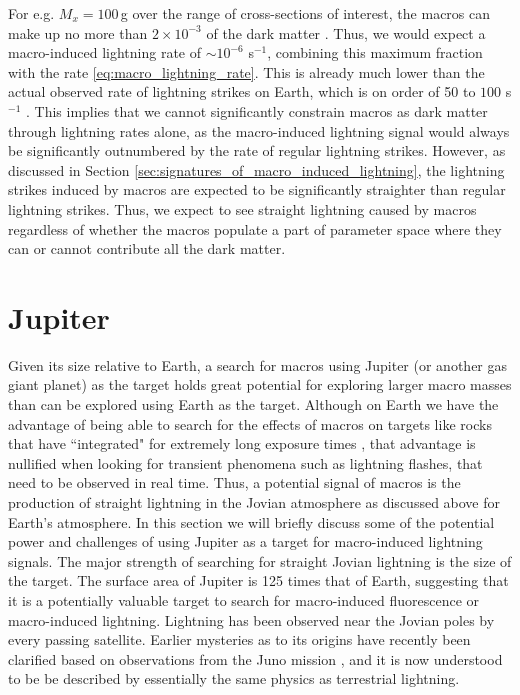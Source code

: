 \documentclass[%
 reprint,
 amsmath,amssymb,
 aps,
]{revtex4-2}
\begin{document}
        For e.g. $M_x = 100\,$g over the range of cross-sections of interest, the macros can make up no more than $2\times 10^{-3}$ of the dark matter \citep{Sidhu2019death}. Thus, we would expect a macro-induced lightning rate of $\sim 10^{-6}$ s$^{-1}$, combining this maximum fraction with the rate \eqref{eq:macro_lightning_rate}. This is already much lower than the actual observed rate of lightning strikes on Earth, which is on order of 50 to $100$ s$^{-1}$ \citep{Mackerras1998}. This implies that we cannot significantly constrain macros as dark matter through lightning rates alone, as the macro-induced lightning signal would always be significantly outnumbered by the rate of regular lightning strikes. However, as discussed in Section \ref{sec:signatures_of_macro_induced_lightning}, the lightning strikes induced by macros are expected to be significantly straighter than regular lightning strikes. Thus, we expect to see straight lightning caused by macros regardless of whether the macros populate a part of parameter space where they can or cannot contribute all the dark matter.

    


\section{Jupiter} %
\label{sec:jovian_bolides}

    Given its size relative to Earth, a search for macros using Jupiter (or another gas giant planet) as the target holds great potential for exploring larger macro masses than can be explored using Earth as the target. Although on Earth we have the advantage of being able to search for the effects of macros on targets like rocks that have ``integrated" for extremely long exposure times \citep{Sidhu2019granite}, that advantage is nullified when looking for transient phenomena such as lightning flashes, that need to be observed in real time. Thus, a potential signal of macros is the production of straight lightning in the Jovian atmosphere as discussed above for Earth's atmosphere. In this section we will briefly discuss some of the potential power and challenges of using Jupiter as a target for macro-induced lightning signals. The major strength of searching for straight Jovian lightning is the size of the target. The surface area of Jupiter is 125 times that of Earth, suggesting that it is a potentially valuable target to search for macro-induced fluorescence or macro-induced lightning. Lightning has been observed near the Jovian poles by every passing satellite. Earlier mysteries as to its origins have recently been clarified based on observations from the Juno mission \citep{Brown2018}, and it is now understood to be be described by essentially the same physics as terrestrial lightning.
\end{document}
